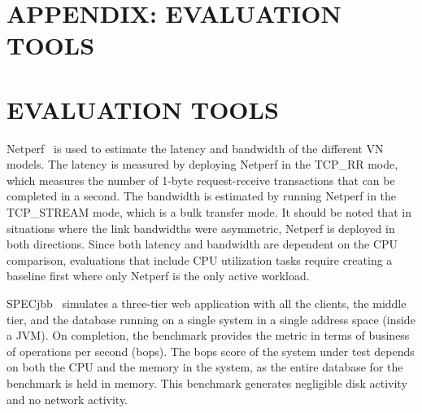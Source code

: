 %

{\chapter*{APPENDIX: EVALUATION TOOLS}
\label{evaluation_tools}
\setcounter{chapter}{1}}
{\chapter{EVALUATION TOOLS}
\label{evaluation_tools}}

Netperf~\cite{netperf} is used to estimate the latency and bandwidth of the
different VN models. The latency is measured by deploying Netperf in the
TCP\_RR mode, which measures the number of 1-byte request-receive transactions
that can be completed in a second. The bandwidth is estimated by running Netperf
in the TCP\_STREAM mode, which is a bulk transfer mode. It should be noted that
in situations where the link bandwidths were asymmetric, Netperf is deployed in
both directions.  Since both latency and bandwidth are dependent on the CPU
comparison, evaluations that include CPU utilization tasks require creating
a baseline first where only Netperf is the only active workload.

SPECjbb~\cite{specjbb} simulates a three-tier web application with all the
clients, the middle tier, and the database running on a single system in a
single address space (inside a JVM). On completion, the benchmark provides the
metric in terms of business of operations per second (bops). The bops score of
the system under test depends on both the CPU and the memory in the system, as
the entire database for the benchmark is held in memory. This benchmark
generates negligible disk activity and no network activity. 
